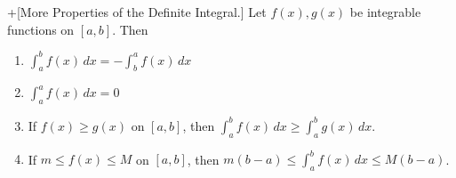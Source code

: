 \documentclass[10pt,]{book}
\theoremstyle{ptxplainnotitle}
\theoremstyle{ptxplaintitle}
\theoremstyle{ptxplainnotitle}
\theoremstyle{ptxplaintitle}
\theoremstyle{ptxplainnotitle}
\theoremstyle{ptxplaintitle}
\theoremstyle{ptxdefinitionnotitle}
\theoremstyle{ptxdefinitiontitle}
\theoremstyle{ptxdefinitionnotitle}
\theoremstyle{ptxdefinitiontitle}
\theoremstyle{ptxdefinitionnotitle}
\theoremstyle{ptxdefinitiontitle}
\theoremstyle{ptxdefinitionnotitle}
\theoremstyle{ptxdefinitiontitle}
\theoremstyle{ptxdefinitionnotitle}
\theoremstyle{ptxdefinitiontitle}
\numberwithin{equation}{section}
\begin{document}
\begin{theorem}+[{More Properties of the Definite Integral.}]\label{theorem-more-properties-of-the-definite-integral}
\hypertarget{p-442}{}%
Let \(f(x),g(x)\) be integrable functions on \([a,b]\). Then \leavevmode%
\begin{enumerate}
\item\hypertarget{li-36}{}\(\int_{a}^{b}f(x)\,dx = - \int_{b}^{a}f(x)\,dx\)%
\item\hypertarget{li-37}{}\(\int_{a}^{a}f(x)\,dx = 0\)%
\item\hypertarget{li-38}{}If \(f(x)\geq g(x)\) on \([a,b]\), then \(\int_{a}^{b}f(x)\,dx \geq \int_{a}^{b}g(x)\,dx\).%
\item\hypertarget{li-39}{}If \(m\leq f(x)\leq M\) on \([a,b]\), then \(m(b-a)\leq \int_{a}^{b}f(x)\,dx\leq M(b-a)\).%
\end{enumerate}
%
\end{theorem}
\typeout{************************************************}
\typeout{************************************************}
\end{document}

